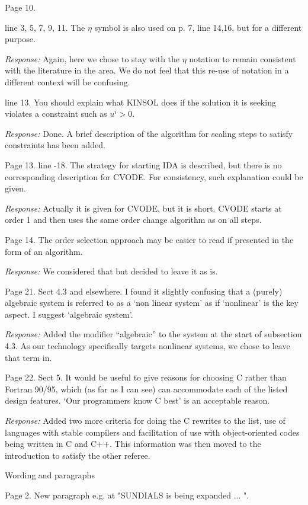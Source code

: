 \documentclass[12pt]{letter}
\begin{document}
Page 10.

line 3, 5, 7, 9, 11. The $\eta$ symbol is also used on p. 7, line
14,16, but for a different purpose.

{\em Response: } Again, here we chose to stay with the $\eta$
notation to remain consistent with the literature in the area.  We
do not feel that this re-use of notation in a different context
will be confusing.

line 13. You should explain what KINSOL does if the solution it is
seeking violates a constraint such as $u^i > 0$.

{\em Response: } Done.  A brief description of the algorithm for
scaling steps to satisfy constraints has been added.

Page 13.
line -18. The strategy for starting IDA is described, but there is no
corresponding description for CVODE. For consistency, such explanation
could be given.

{\em Response:} Actually it is given for CVODE, but it is short.
CVODE starts at order 1 and then uses the same order change algorithm
as on all steps.

Page 14. The order selection approach may be easier to read if
presented in the form of an algorithm.

{\em Response:} We considered that but decided to leave it as is.

Page 21. Sect 4.3 and elsewhere. I found it slightly confusing that a
(purely) algebraic system is referred to as a `non linear system' as
if `nonlinear' is the key aspect.  I suggest `algebraic system'.

{\em Response: } Added the modifier ``algebraic'' to the system at
the start of subsection 4.3.  As our technology specifically
targets nonlinear systems, we chose to leave that term in.

Page 22. Sect 5. It would be useful to give reasons for choosing C
rather than Fortran 90/95, which (as far as I can see) can accommodate
each of the listed design features.  `Our programmers know C best' is
an acceptable reason.

{\em Response: } Added two more criteria for doing the C rewrites
to the list, use of languages with stable compilers and
facilitation of use with object-oriented codes being written in C
and C++.  This information was then moved to the introduction to
satisfy the other referee.

Wording and paragraphs

Page 2. New paragraph e.g. at "SUNDIALS is being expanded ... ".
\end{document}
